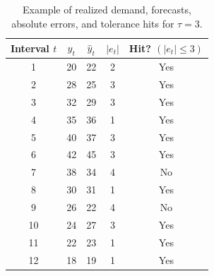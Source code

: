 \begin{table}[h!]
\centering
\begin{tabular}{c c c c c}
\toprule
Interval $t$ & $y_t$ & $\hat{y}_t$ & $|e_t|$ & Hit? $(|e_t| \le 3)$ \\
\midrule
1  & 20 & 22 & 2 & Yes \\
2  & 28 & 25 & 3 & Yes \\
3  & 32 & 29 & 3 & Yes \\
4  & 35 & 36 & 1 & Yes \\
5  & 40 & 37 & 3 & Yes \\
6  & 42 & 45 & 3 & Yes \\
7  & 38 & 34 & 4 & No  \\
8  & 30 & 31 & 1 & Yes \\
9  & 26 & 22 & 4 & No  \\
10 & 24 & 27 & 3 & Yes \\
11 & 22 & 23 & 1 & Yes \\
12 & 18 & 19 & 1 & Yes \\
\bottomrule
\end{tabular}

\caption{Example of realized demand, forecasts, absolute errors, and tolerance hits for \(\tau = 3\).}
\label{tab:hrat_example}
\end{table}
